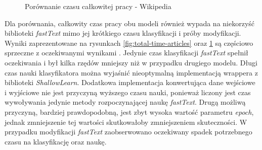 \begin{figure}[ht!]
	\centering
    \qquad
	\caption{Porównanie czasu całkowitej pracy - Wikipedia}
    \label{fig:total-time-wikipedia}
\end{figure}

Dla porównania, całkowity czas pracy obu modeli również wypada na niekorzyść biblioteki \textit{fastText} mimo jej krótkiego czasu klasyfikacji i próby modyfikacji. Wyniki zaprezentowane na rysunkach \ref{fig:total-time-articles} oraz \ref{fig:total-time-wikipedia} są częściowo sprzeczne z oczekiwanymi wynikami \cite{joulin2016bag}. Jedynie czas klasyfikacji \textit{fastText} spełnił oczekiwania i był kilka rzędów mniejszy niż w przypadku drugiego modelu. Długi czas nauki klasyfikatora można wyjaśnić nieoptymalną implementacją wrappera z biblioteki \textit{ShallowLearn}. Dodatkowa implementacja konwertująca dane wejściowe i wyjściowe nie jest przyczyną wyższego czasu nauki, ponieważ liczony jest czas wywoływania jedynie metody rozpoczynającej naukę \textit{fastText}. Drugą możliwą przyczyną, bardziej prawdopodobną, jest zbyt wysoka wartość parametru \textit{epoch}, jednak zmniejszenie tej wartości skutkowałoby zmniejszeniem skuteczności. W przypadku modyfikacji \textit{fastText} zaobserwowano oczekiwany spadek potrzebnego czasu na klasyfikację oraz naukę.
\newpage
